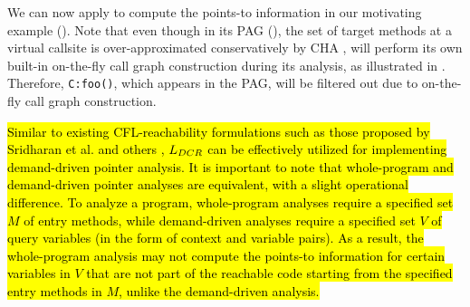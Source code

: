 \begin{comment}

\begin{theorem}[\textsc{Correctness}] \label{theorem:correctness}
Let CFL-CFA be the CFL\linebreak-reachability-based pointer analysis for solving \capLFCR. For a program,
CFL-CFA computes exactly the same points-to information as $L_{FC}^{ot}$, i.e, \manuLFC plus (1) an oracle for telling where to perform dispatching at a callsite under certain context and (2) a type filtering mechanism that handle parameter passing precisely for receiver variables by allowing receiver objects flow to the methods dispatched by themselves. 
\end{theorem}
\begin{proof}
\Cref{theorem:handlingReceiver} and \Cref{theorem:parameterpassing}
\end{proof}
\end{comment}




We  can now apply \LFCR to compute    the  points-to
information in our motivating example (). Note that even though in its PAG (), the set of target methods
at a virtual callsite  is over-approximated conservatively by CHA \cite{dean1995optimization}, \LFCR will perform its own built-in on-the-fly call
graph construction during its analysis, as illustrated  in
. Therefore,
\texttt{C:foo()}, which appears in the PAG,
will be filtered out due to on-the-fly call graph construction.

\hl{
Similar to existing CFL-reachability formulations such as those proposed by Sridharan et al. \cite{sridharan2005demand, sridharan2006refinement} and others \cite{zheng2008demand, yan2011demand, shang2012demand}, $\mbox{${L}_{DCR}$}$ can be effectively utilized for implementing demand-driven pointer analysis. It is important to note that whole-program and demand-driven pointer analyses are equivalent, with a slight operational difference. 
To analyze a program, whole-program analyses require a specified set $M$ of entry methods, while demand-driven analyses require a specified set $V$ of query variables (in the form of context and variable pairs). As a result, the whole-program analysis may not compute the points-to information for certain variables in $V$ that are not part of the reachable code starting from the specified entry methods in $M$, unlike the demand-driven analysis.
}

